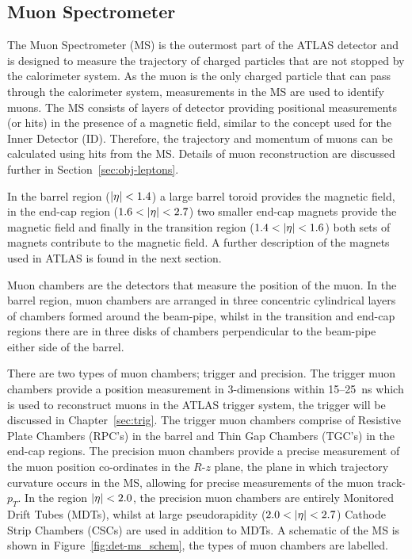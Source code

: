 \subsection{Muon Spectrometer}
\label{sec:det-MS}

The Muon Spectrometer (MS) is the outermost part of the ATLAS detector and is designed to measure the trajectory
of charged particles that are not stopped by the calorimeter system.
As the muon is the only charged particle that can pass through the calorimeter system,
measurements in the MS are used to identify muons.
The MS consists of layers of detector providing positional measurements (or hits)
in the presence of a magnetic field, similar to the concept used for the Inner Detector (ID).
Therefore, the trajectory and momentum of muons can be calculated using hits from the MS.
Details of muon reconstruction are discussed further in Section~\ref{sec:obj-leptons}.

In the barrel region ($|\eta|\nobreak<\nobreak1.4$) a large barrel toroid provides the magnetic field,
in the end-cap region ($1.6\nobreak<\nobreak|\eta|\nobreak<\nobreak2.7$) two smaller end-cap magnets  provide the magnetic field
and finally in the transition region ($1.4\nobreak<\nobreak|\eta|\nobreak<\nobreak1.6$) both sets of magnets contribute to the magnetic field.
A further description of the magnets used in ATLAS is found in the next section. 

Muon chambers are the detectors that measure the position of the muon.
In the barrel region,  muon chambers are arranged in three concentric cylindrical layers of chambers formed around the beam-pipe,
whilst in the transition and end-cap regions there are in three disks of chambers perpendicular to the beam-pipe either side of the barrel.

There are two types of muon chambers; trigger and precision.
The trigger muon chambers provide a position measurement in 3-dimensions within 15--\SI{25}{\nano\second} which is used to reconstruct muons in the ATLAS trigger system,
the trigger will be discussed in Chapter~\ref{sec:trig}.
The trigger muon chambers comprise of Resistive Plate Chambers (RPC’s) in the barrel 
and Thin Gap Chambers (TGC’s) in the end-cap regions.
The precision muon chambers provide a precise measurement of the muon position co-ordinates in the $R$-$z$ plane,
the plane in which trajectory curvature occurs in the MS, allowing for precise measurements of the muon track-$p_T$. 
In the region $|\eta|\nobreak<\nobreak2.0$, the precision muon chambers are entirely Monitored Drift Tubes (MDTs),
whilst at large pseudorapidity ($2.0\nobreak<\nobreak|\eta|\nobreak<\nobreak2.7$) Cathode Strip Chambers (CSCs) are used in addition to MDTs.
A schematic of the MS is shown in Figure~\ref{fig:det-ms_schem}, the types of muon chambers are labelled.

